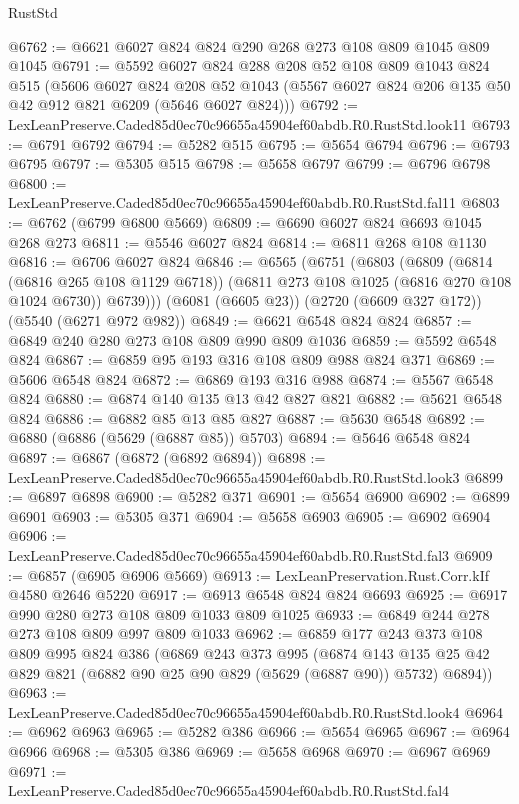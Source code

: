 \begin{lexlean}{RustStd}
\begin{coremodule}
@6762 := @6621 @6027 @824 @824 @290 @268 @273 @108 @809 @1045 @809 @1045
@6791 := @5592
    @6027
    @824
    @288
    @208
    @52
    @108
    @809
    @1043
    @824
    @515
    (@5606
      @6027
      @824
      @208
      @52
      @1043
      (@5567 @6027 @824 @206 @135 @50 @42 @912 @821 @6209 (@5646 @6027 @824)))
@6792 := LexLeanPreserve.Caded85d0ec70c96655a45904ef60abdb.R0.RustStd.look11
@6793 := @6791 @6792
@6794 := @5282 @515
@6795 := @5654 @6794
@6796 := @6793 @6795
@6797 := @5305 @515
@6798 := @5658 @6797
@6799 := @6796 @6798
@6800 := LexLeanPreserve.Caded85d0ec70c96655a45904ef60abdb.R0.RustStd.fal11
@6803 := @6762 (@6799 @6800 @5669)
@6809 := @6690 @6027 @824 @6693 @1045 @268 @273
@6811 := @5546 @6027 @824
@6814 := @6811 @268 @108 @1130
@6816 := @6706 @6027 @824
@6846 := @6565
    (@6751
      (@6803
        (@6809
          (@6814 (@6816 @265 @108 @1129 @6718))
          (@6811 @273 @108 @1025 (@6816 @270 @108 @1024 @6730))
          @6739)))
    (@6081 (@6605 @23))
    (@2720 (@6609 @327 @172))
    (@5540 (@6271 @972 @982))
@6849 := @6621 @6548 @824 @824
@6857 := @6849 @240 @280 @273 @108 @809 @990 @809 @1036
@6859 := @5592 @6548 @824
@6867 := @6859 @95 @193 @316 @108 @809 @988 @824 @371
@6869 := @5606 @6548 @824
@6872 := @6869 @193 @316 @988
@6874 := @5567 @6548 @824
@6880 := @6874 @140 @135 @13 @42 @827 @821
@6882 := @5621 @6548 @824
@6886 := @6882 @85 @13 @85 @827
@6887 := @5630 @6548
@6892 := @6880 (@6886 (@5629 (@6887 @85)) @5703)
@6894 := @5646 @6548 @824
@6897 := @6867 (@6872 (@6892 @6894))
@6898 := LexLeanPreserve.Caded85d0ec70c96655a45904ef60abdb.R0.RustStd.look3
@6899 := @6897 @6898
@6900 := @5282 @371
@6901 := @5654 @6900
@6902 := @6899 @6901
@6903 := @5305 @371
@6904 := @5658 @6903
@6905 := @6902 @6904
@6906 := LexLeanPreserve.Caded85d0ec70c96655a45904ef60abdb.R0.RustStd.fal3
@6909 := @6857 (@6905 @6906 @5669)
@6913 := LexLeanPreservation.Rust.Corr.kIf @4580 @2646 @5220
@6917 := @6913 @6548 @824 @824 @6693
@6925 := @6917 @990 @280 @273 @108 @809 @1033 @809 @1025
@6933 := @6849 @244 @278 @273 @108 @809 @997 @809 @1033
@6962 := @6859
    @177
    @243
    @373
    @108
    @809
    @995
    @824
    @386
    (@6869
      @243
      @373
      @995
      (@6874 @143 @135 @25 @42 @829 @821 (@6882 @90 @25 @90 @829 (@5629 (@6887 @90)) @5732) @6894))
@6963 := LexLeanPreserve.Caded85d0ec70c96655a45904ef60abdb.R0.RustStd.look4
@6964 := @6962 @6963
@6965 := @5282 @386
@6966 := @5654 @6965
@6967 := @6964 @6966
@6968 := @5305 @386
@6969 := @5658 @6968
@6970 := @6967 @6969
@6971 := LexLeanPreserve.Caded85d0ec70c96655a45904ef60abdb.R0.RustStd.fal4

\end{coremodule}
\end{lexlean}
